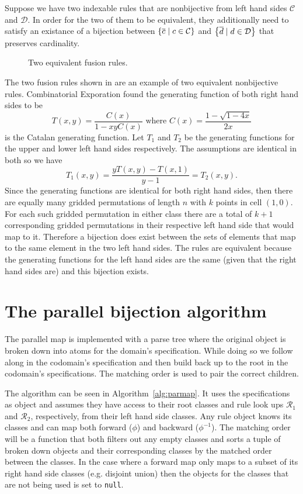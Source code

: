 Suppose we have two indexable rules that are nonbijective from left hand sides $\mathcal{C}$ and $\mathcal{D}$. In order for the two of them to be equivalent, they additionally need to satisfy an existance of a bijection between $\left\{\overline{c} \mid c \in \mathcal{C}\right\}$ and $\left\{\overline{d} \mid d \in \mathcal{D}\right\}$ that preserves cardinality.

\begin{figure}[ht!]
    \centering
    
    \caption{Two equivalent fusion rules.}
    \label{fig:fuseq}
\end{figure}

The two fusion rules shown in  are an example of two equivalent nonbijective rules.  Combinatorial Exporation found the generating function of both right hand sides to be
\[
    T(x,y) = \frac{C(x)}{1-xyC(x)} \text{ where } C(x) = \frac{1-\sqrt{1-4x}}{2x}
\]
is the Catalan generating function. Let $T_1$ and $T_2$ be the generating functions for the upper and lower left hand sides respectively. The assumptions are identical in both so we have
\[
    T_1(x,y) = \frac{yT(x,y)-T(x,1)}{y-1} = T_2(x,y).
\]
Since the generating functions are identical for both right hand sides, then there are equally many gridded permutations of length $n$ with $k$ points in cell $(1,0)$. For each such gridded permutation in either class there are a total of $k+1$ corresponding gridded permutations in their respective left hand side that would map to it. Therefore a bijection does exist between the sets of elements that map to the same element in the two left hand sides. The rules are equivalent because the generating functions for the left hand sides are the same (given that the right hand sides are) and this bijection exists.

\section{The parallel bijection algorithm}
The parallel map is implemented with a parse tree where the original object is broken down into atoms for the domain's specification. While doing so we follow along in the codomain's specification and then build back up to the root in the codomain's specifications. The matching order is used to pair the correct children.

The algorithm can be seen in Algorithm~\ref{alg:parmap}. It uses the specifications as object and assumes they have access to their root classes and rule look ups $\mathscr{R}_1$ and $\mathscr{R}_2$, respectively, from their left hand side classes. Any rule object knows its classes and can map both forward ($\phi$) and backward ($\phi^{-1}$). The matching order will be a function that both filters out any empty classes and sorts a tuple of broken down objects and their corresponding classes by the matched order between the classes. In the case where a forward map only maps to a subset of its right hand side classes (e.g. disjoint union) then the objects for the classes that are not being used is set to \texttt{null}.

